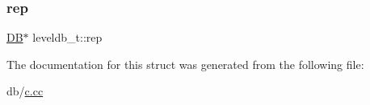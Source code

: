 \subsubsection{\texorpdfstring{rep}{rep}}
{\footnotesize\ttfamily \mbox{\hyperlink{classleveldb_1_1_d_b}{DB}}$\ast$ leveldb\+\_\+t\+::rep}



The documentation for this struct was generated from the following file\+:\begin{DoxyCompactItemize}
\item 
db/\mbox{\hyperlink{c_8cc}{c.\+cc}}\end{DoxyCompactItemize}
